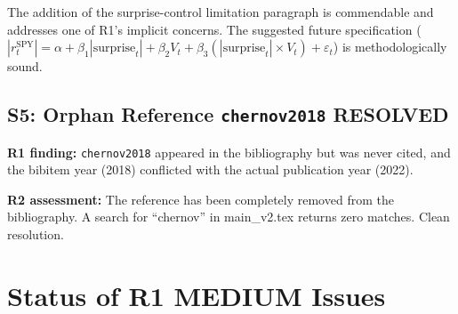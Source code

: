 \documentclass[12pt,a4paper]{article}
\begin{document}
The addition of the surprise-control limitation paragraph is commendable and addresses one of R1's implicit concerns. The suggested future specification ($|r_t^{\text{SPY}}| = \alpha + \beta_1 |\text{surprise}_t| + \beta_2 V_t + \beta_3 (|\text{surprise}_t| \times V_t) + \varepsilon_t$) is methodologically sound.


\subsection*{S5: Orphan Reference \texttt{chernov2018} \hfill \textcolor{okgreen}{RESOLVED}}

\textbf{R1 finding:} \texttt{chernov2018} appeared in the bibliography but was never cited, and the bibitem year (2018) conflicted with the actual publication year (2022).

\textbf{R2 assessment:} The reference has been completely removed from the bibliography. A search for ``chernov'' in main\_v2.tex returns zero matches. Clean resolution.


\bigskip

\section*{Status of R1 MEDIUM Issues}
\end{document}
